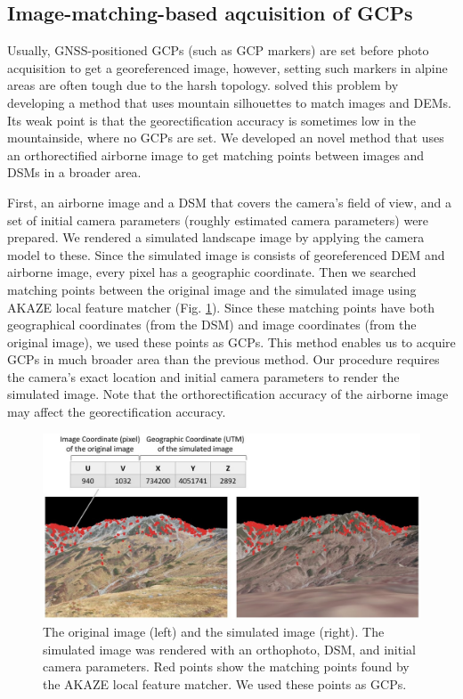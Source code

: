\documentclass{article}
\begin{document}
\hypertarget{image-matching-based-aqcuisition-of-gcps}{%
\subsection{Image-matching-based aqcuisition of GCPs}\label{image-matching-based-aqcuisition-of-gcps}}

Usually, GNSS-positioned GCPs (such as GCP markers) are set before photo acquisition to get a georeferenced image, however, setting such markers in alpine areas are often tough due to the harsh topology. \cite{Portenier2020Cryosphere} solved this problem by developing a method that uses mountain silhouettes to match images and DEMs. Its weak point is that the georectification accuracy is sometimes low in the mountainside, where no GCPs are set. We developed an novel method that uses an orthorectified airborne image to get matching points between images and DSMs in a broader area.

First, an airborne image and a DSM that covers the camera's field of view, and a set of initial camera parameters (roughly estimated camera parameters) were prepared. We rendered a simulated landscape image by applying the camera model to these. Since the simulated image is consists of georeferenced DEM and airborne image, every pixel has a geographic coordinate. Then we searched matching points between the original image and the simulated image using AKAZE local feature matcher (Fig. \ref{fig:matched}). Since these matching points have both geographical coordinates (from the DSM) and image coordinates (from the original image), we used these points as GCPs. This method enables us to acquire GCPs in much broader area than the previous method. Our procedure requires the camera's exact location and initial camera parameters to render the simulated image. Note that the orthorectification accuracy of the airborne image may affect the georectification accuracy.



\begin{figure}
\includegraphics[width=1\linewidth]{paper_files/figures/Slide4} \caption{The original image (left) and the simulated image (right). The simulated image was rendered with an orthophoto, DSM, and initial camera parameters. Red points show the matching points found by the AKAZE local feature matcher. We used these points as GCPs.}\label{fig:matched}
\end{figure}
\end{document}
